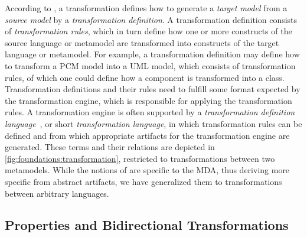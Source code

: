 According to \textcite{kleppe2003mdaExplained-Book}, a transformation defines how to generate a \emph{target model} from a \emph{source model} by a \emph{transformation definition}.
A transformation definition consists of \emph{transformation rules}, which in turn define how one or more constructs of the source language or metamodel are transformed into constructs of the target language or metamodel.
For example, a transformation definition may define how to transform a \gls{PCM} model into a \gls{UML} model, which consists of transformation rules, of which one could define how a component is transformed into a class.
Transformation definitions and their rules need to fulfill some format expected by the transformation engine, which is responsible for applying the transformation rules.
A transformation engine is often supported by a \emph{transformation definition language}~\cite[Sec.~9.2]{kleppe2003mdaExplained-Book}, or short \emph{transformation language}, in which transformation rules can be defined and from which appropriate artifacts for the transformation engine are generated.
These terms and their relations are depicted in \autoref{fig:foundations:transformation}, restricted to transformations between two metamodels.
While the notions of \textcite{kleppe2003mdaExplained-Book} are specific to the \gls{MDA}, thus deriving more specific from abstract artifacts, we have generalized them to transformations between arbitrary languages.


\subsection{Properties and Bidirectional Transformations}
\label{chap:foundations:transformations:properties}

